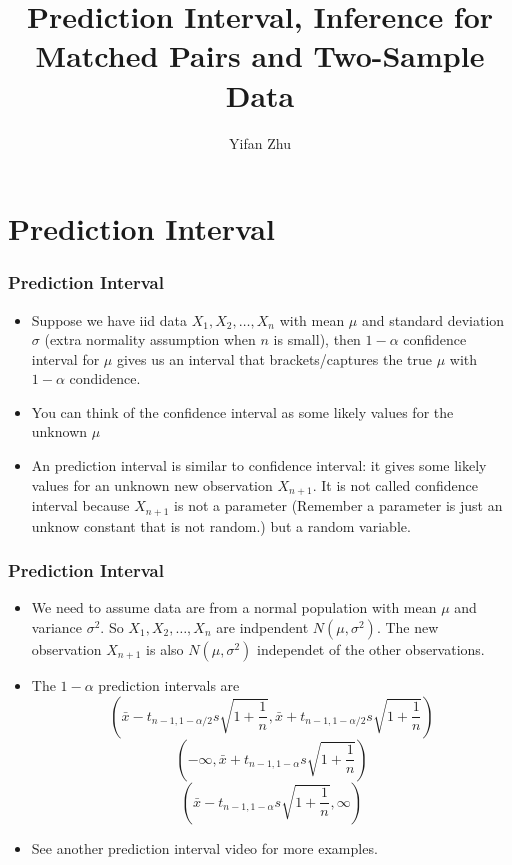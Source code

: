 \documentclass[handout]{beamer}\usepackage[]{graphicx}\usepackage[]{color}
\title{Prediction Interval, Inference for Matched Pairs and Two-Sample Data}
\author{Yifan Zhu}
\date{}
\institute{Iowa State University}
\numberwithin{equation}{section}
\begin{document}
\begin{frame}
\titlepage
 \end{frame}
 

\section{Prediction Interval}
\begin{frame}
\frametitle{Prediction Interval}
\begin{itemize}
\item Suppose we have iid data $X_1, X_2, \ldots, X_n$ with mean $\mu$ and standard deviation $\sigma$ (extra normality assumption when $n$ is small), then $1 - \alpha$ confidence interval for $\mu$ gives us an interval that brackets/captures the true $\mu$ with $1 - \alpha$ condidence.

\item You can think of the confidence interval as some likely values for the unknown $\mu$

\item An prediction interval is similar to confidence interval: it gives some likely values for an unknown new observation $X_{n+1}$. It is not called confidence interval because $X_{n+1}$ is not a parameter (Remember a parameter is just an unknow constant that is not random.) but a random variable.  
\end{itemize}
\end{frame}

\begin{frame}
\frametitle{Prediction Interval}
\begin{itemize}
\item
We need to assume data are from a normal population with mean $\mu$ and variance $\sigma^2$. So $X_1, X_2, \ldots, X_n$ are indpendent $N(\mu, \sigma^2)$. The new observation $X_{n+1}$ is also $N(\mu, \sigma^2)$ independet of the other observations.

\item
The $1 - \alpha$ prediction intervals are
\[\left(\bar{x} - t_{n-1, 1 - \alpha/2}s\sqrt{1 + \frac{1}{n}}, \bar{x} + t_{n-1, 1 - \alpha/2}s\sqrt{1 + \frac{1}{n}}\right)\]
\[\left(-\infty, \bar{x} + t_{n-1, 1 - \alpha}s\sqrt{1 + \frac{1}{n}}\right)\]
\[\left(\bar{x} - t_{n-1, 1 - \alpha}s\sqrt{1 + \frac{1}{n}}, \infty\right)\]
\item
See another prediction interval video for more examples. 
\end{itemize}
\end{frame}
\end{document}

